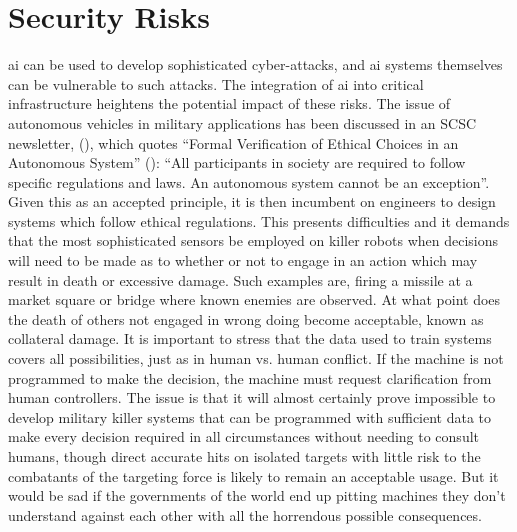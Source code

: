 \section{Security Risks}
\gls{ai} can be used to develop sophisticated cyber-attacks, and \gls{ai} systems themselves can be vulnerable to such attacks. The integration of \gls{ai} into critical infrastructure heightens the potential impact of these risks. The issue of autonomous vehicles in military applications has been discussed in an SCSC newsletter, (\cite{citation:SCSC152}), which quotes ``Formal Verification of Ethical Choices in an Autonomous System'' (\cite{citation:Dennis2015}): ``All participants in society are required to follow specific regulations and laws. An autonomous system cannot be an exception''. Given this as an accepted  principle, it is then incumbent on engineers to design systems which follow ethical regulations. This presents difficulties and it demands that the most sophisticated sensors be employed on killer robots when decisions will need to be made as to whether or not to engage in an action which may result in death or excessive damage. Such examples are, firing a missile at a market square or bridge where known enemies are observed. At what point does the death of others not engaged in wrong doing become acceptable, known as collateral damage. It is important to stress that  the data used to train systems covers all possibilities, just as in human vs.  human conflict. If the machine is not programmed to make the decision, the machine must request clarification from human controllers. The issue is that it will almost certainly prove impossible to develop military killer systems that can be programmed with sufficient data to make every decision required in all circumstances without needing to consult humans, though direct accurate hits on isolated targets with little risk to the combatants of the targeting force is likely to remain an acceptable usage. But it would be sad if the governments of the world end up pitting machines they don’t understand against each other with all the horrendous possible consequences.


